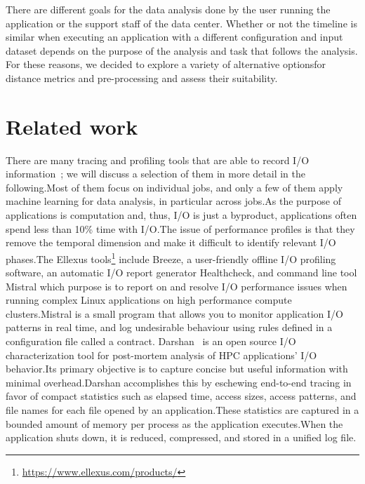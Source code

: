 \documentclass{jhps}
\begin{document}
There are different goals for the data analysis done by the user running the application or the support staff of the data center.
Whether or not the timeline is similar when executing an application with a different configuration and input dataset depends on the purpose of the analysis and task that follows the analysis.
For these reasons, we decided to explore a variety of alternative optionsfor distance metrics and pre-processing and assess their suitability.


\section{Related work}
There are many tracing and profiling tools that are able to record I/O information~\cite{TFAPIKBBCF19}; we will discuss a selection of them in more detail in the following.Most of them focus on individual jobs, and only a few of them apply machine learning for data analysis, in particular across jobs.As the purpose of applications is computation and, thus, I/O is just a byproduct, applications often spend less than 10\% time with I/O.The issue of performance profiles is that they remove the temporal dimension and make it difficult to identify relevant I/O phases.The Ellexus tools\footnote{\url{https://www.ellexus.com/products/}} include Breeze, a user-friendly offline I/O profiling software, an automatic I/O report generator Healthcheck, and command line tool Mistral which purpose is to report on and resolve I/O performance issues when running complex Linux applications on high performance compute clusters.Mistral is a small program that allows you to monitor application I/O patterns in real time, and log undesirable behaviour using rules defined in a configuration file called a contract.
Darshan~\cite{carns2011understanding-toc,hpcdarshan} is an open source I/O characterization tool for post-mortem analysis of HPC applications' I/O behavior.Its primary objective is to capture concise but useful information with minimal overhead.Darshan accomplishes this by eschewing end-to-end tracing in favor of compact statistics such as elapsed time, access sizes, access patterns, and file names for each file opened by an application.These statistics are captured in a bounded amount of memory per process as the application executes.When the application shuts down, it is reduced, compressed, and stored in a unified log file.%
\end{document}
